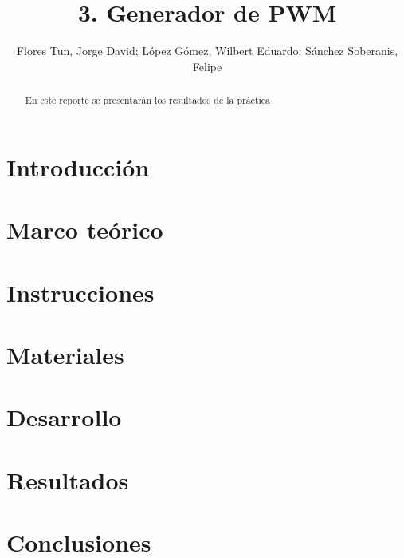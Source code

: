 \documentclass[]{article}
\title{3. Generador de PWM}
\author{Flores Tun, Jorge David; López Gómez, Wilbert Eduardo; Sánchez Soberanis, Felipe}
\begin{document}
\maketitle

\begin{abstract}
    En este reporte se presentarán los resultados de la práctica 
\end{abstract}

\section{Introducción}

\section{Marco teórico}

\section{Instrucciones}

\section{Materiales}

\section{Desarrollo}

\section{Resultados}

\section{Conclusiones}


\end{document}
